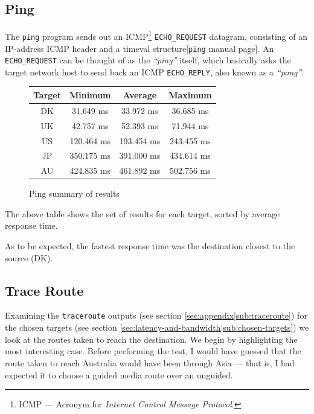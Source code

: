 \documentclass{acm_proc_article-sp}
\newcommand{\code}[1]{{\tt #1}}
\newcommand{\prog}[1]{{\tt #1}}
\newcommand{\secref}[1]{(see section \ref{#1})}
\begin{document}
\subsection{Ping}
\label{sec:latency-and-bandwidth|sub:ping}
The \prog{ping} program sends out an ICMP\footnote{ICMP --- Acronym for {\it
Internet Control Message Protocol}.} \code{ECHO\_REQUEST} datagram, consisting
of an IP-address  ICMP header and a timeval structure[\prog{ping} manual
page]. An \code{ECHO\_REQUEST} can be thought of as the {\it ``ping''} itself,
which basically asks the target network host to send back an ICMP
\code{ECHO\_REPLY}, also known as a {\it ``pong''}.

\begin{figure}[H]
    \center
    \begin{tabular}{|c|c|c|c|}
        \hline
        {\bf Target} & {\bf Minimum} & {\bf Average} & {\bf Maximum} \\ \hline
        DK & 31.649 ms  & 33.972 ms  & 36.685 ms \\ \hline
        UK & 42.757 ms  & 52.393 ms  & 71.944 ms \\ \hline
        US & 120.464 ms & 193.454 ms & 243.455 ms \\ \hline
        JP & 350.175 ms & 391.000 ms & 434.614 ms \\ \hline
        AU & 424.835 ms & 461.892 ms & 502.756 ms \\ \hline
    \end{tabular}
    \caption{Ping summary of results}
    \label{table:ping}
\end{figure}

The above table shows the set of results for each target, sorted by average
response time.

As to be expected, the fastest response time was the destination closest to
the source (DK).

\subsection{Trace Route}
\label{sec:latency-and-bandwidth|sub:traceroute}
Examining the \prog{traceroute} outputs \secref{sec:appendix|sub:traceroute}
for the chosen targets \secref{sec:latency-and-bandwidth|sub:chosen-targets}
we look at the routes taken to reach the destination. We begin by highlighting
the most interesting case. Before performing the test, I would have guessed
that the route taken to reach Australia would have been through Asia --- that
is, I had expected it to choose a guided media route over an unguided.
\end{document}
